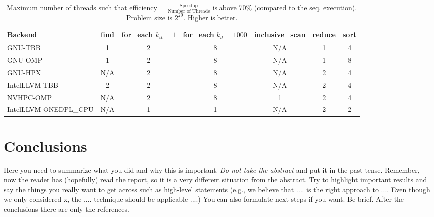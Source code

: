\documentclass[sigconf]{acmart}
\begin{document}
\begin{table}[t]
      \centering
      \centering
      \caption{Maximum number of threads such that efficiency = $\frac{\text{Speedup}}{\text{Number of Threads}}$ is above 70\% (compared to the seq. execution). Problem size is $2^{29}$. Higher is better.}\label{tab:summary_maxspeedup}
      \begin{tabular}{l c c c c c c}
            \hline
            \textbf{Backend}      & \textbf{find} & \makecell{\textbf{for\_each}                   \\$k_{it}=1$} & \makecell{\textbf{for\_each}\\$k_{it}=1000$} & \textbf{inclusive\_scan} & \textbf{reduce} & \textbf{sort} \\
            \hline
            GNU-TBB               & 1             & 2                            & 8 & N/A & 1 & 4 \\
            GNU-OMP               & 1             & 2                            & 8 & N/A & 1 & 8 \\
            GNU-HPX               & N/A           & 2                            & 8 & N/A & 2 & 4 \\
            IntelLLVM-TBB         & 2             & 2                            & 8 & N/A & 2 & 4 \\
            NVHPC-OMP             & N/A           & 2                            & 8 & 1   & 2 & 4 \\
            IntelLLVM-ONEDPL\_CPU & N/A           & 1                            & 1 & N/A & 2 & 2 \\
            \hline
      \end{tabular}
\end{table}

\section{Conclusions}

Here you need to summarize what you did and why this is important. {\em Do not
            take the abstract} and put it in the past tense. Remember, now the reader has
(hopefully) read the report, so it is a very different situation from the
abstract. Try to highlight important results and say the things you really want
to get across such as high-level statements (e.g., we believe that .... is the
right approach to .... Even though we only considered x, the .... technique
should be applicable ....) You can also formulate next steps if you want. Be
brief. After the conclusions there are only the references.
\end{document}
